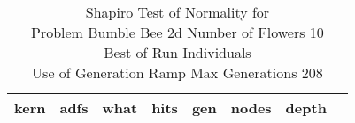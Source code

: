 \begin{table}[H]
\caption{Shapiro Test of Normality for \\ Problem  Bumble Bee 2d  Number of Flowers 10\\Best of Run Individuals \\ Use of Generation Ramp  Max Generations 208\\}
\begin{center}
\scalebox{0.8} %
{
\begin{tabular}{lrrrrrrr}
\hline
kern & adfs & what & hits & gen & nodes & depth \\
\hline


\end{tabular}
}
\end{center}
\end{table}

